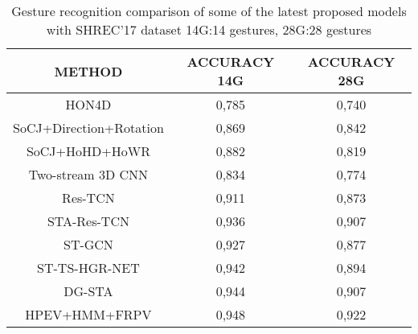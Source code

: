 \documentclass[12pt]{book}
\begin{document}
\begin{table}[!htbp]
\centering
\begin{tabular}{|c|c|c|}
\hline
\textbf{METHOD}                       & \textbf{ACCURACY 14G} & \textbf{ACCURACY 28G} \\ \hline
HON4D \cite{OMA2013}                  & 0,785                 & 0,740                 \\ \hline
SoCJ+Direction+Rotation \cite{SME2017} & 0,869                 & 0,842                 \\ \hline
SoCJ+HoHD+HoWR \cite{HAZ2016}          & 0,882                 & 0,819                 \\ \hline
Two-stream 3D CNN \cite{JUA2018}       & 0,834                 & 0,774                 \\ \hline
Res-TCN \cite{JIN2018}                 & 0,911                 & 0,873                 \\ \hline
STA-Res-TCN \cite{JIN2018}            & 0,936                 & 0,907                 \\ \hline
ST-GCN \cite{YAN2018}                  & 0,927                 & 0,877                 \\ \hline
ST-TS-HGR-NET \cite{XUA2019}           & 0,942                 & 0,894                 \\ \hline
DG-STA \cite{YUX2019}                  & 0,944                 & 0,907                 \\ \hline
HPEV+HMM+FRPV                         & 0,948                 & 0,922                 \\ \hline
\end{tabular}
\caption{Gesture recognition comparison of some of the latest proposed models with SHREC’17 dataset 14G:14 gestures, 28G:28 gestures \cite{LIU2020}}
\label{tab:tab6}
\end{table}



\end{document}
